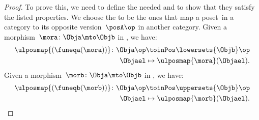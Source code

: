 \begin{proof}
    To prove this, we need to define the needed  and to show that they satisfy the listed properties.
    We choose the  to be the ones that map a poset~\posA in a category to its opposite version~$\posA\op$ in another category.
    Given a morphism~$\mora\colon \Obja \mto \Objb$ in \UPos, we have:
    \begin{equation}
        \begin{aligned}
            \ulposmap{(\funeqa(\mora))}\colon \Obja\op & \toinPos \lowersets{\Objb}\op \\
            \Objael                                    & \mapsto \ulposmap{\mora}(\Objael).
        \end{aligned}
    \end{equation}
    Given a morphism~$\morb\colon \Obja \mto \Objb$ in \LPos, we have:
    \begin{equation}
        \begin{aligned}
            \ulposmap{(\funeqb(\morb))}\colon \Obja\op & \toinPos \uppersets{\Objb}\op \\
            \Objael                                    & \mapsto \ulposmap{\morb}(\Objael).
        \end{aligned}
    \end{equation}


\end{proof}
